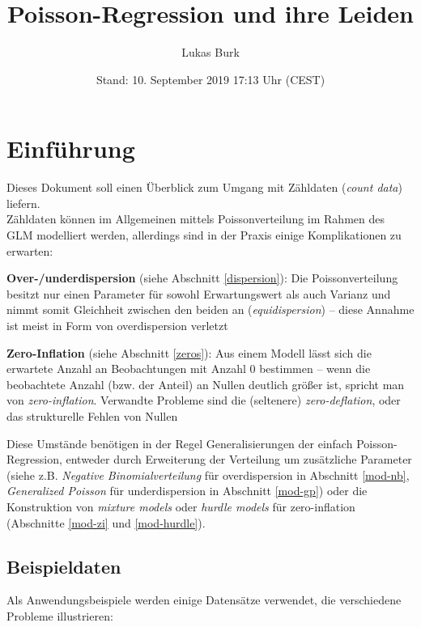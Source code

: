 \documentclass[ngerman,a4paper,]{scrartcl}
\title{Poisson-Regression und ihre Leiden}
\author{Lukas Burk}
\date{Stand: 10. September 2019 17:13 Uhr (CEST)}
\theoremstyle{definition}
\theoremstyle{definition}
\theoremstyle{definition}
\theoremstyle{remark}
\begin{document}
\maketitle

{
\hypersetup{linkcolor=black}
\setcounter{tocdepth}{2}
\tableofcontents
}
\hypertarget{einfuhrung}{%
\section{Einführung}\label{einfuhrung}}

Dieses Dokument soll einen Überblick zum Umgang mit Zähldaten (\emph{count data}) liefern.\\
Zähldaten können im Allgemeinen mittels Poissonverteilung im Rahmen des GLM modelliert werden, allerdings sind in der Praxis einige Komplikationen zu erwarten:

\textbf{Over-/underdispersion} (siehe Abschnitt \ref{dispersion}): Die Poissonverteilung besitzt nur einen Parameter für sowohl Erwartungswert als auch Varianz und nimmt somit Gleichheit zwischen den beiden an (\emph{equidispersion}) -- diese Annahme ist meist in Form von overdispersion verletzt

\textbf{Zero-Inflation} (siehe Abschnitt \ref{zeros}): Aus einem Modell lässt sich die erwartete Anzahl an Beobachtungen mit Anzahl \(0\) bestimmen -- wenn die beobachtete Anzahl (bzw. der Anteil) an Nullen deutlich größer ist, spricht man von \emph{zero-inflation}. Verwandte Probleme sind die (seltenere) \emph{zero-deflation}, oder das strukturelle Fehlen von Nullen

Diese Umstände benötigen in der Regel Generalisierungen der einfach Poisson-Regression, entweder durch Erweiterung der Verteilung um zusätzliche Parameter (siehe z.B. \emph{Negative Binomialverteilung} für overdispersion in Abschnitt \ref{mod-nb}, \emph{Generalized Poisson} für underdispersion in Abschnitt \ref{mod-gp}) oder die Konstruktion von \emph{mixture models} oder \emph{hurdle models} für zero-inflation (Abschnitte \ref{mod-zi} und \ref{mod-hurdle}).

\hypertarget{data}{%
\subsection{Beispieldaten}\label{data}}

Als Anwendungsbeispiele werden einige Datensätze verwendet, die verschiedene Probleme illustrieren:
\end{document}
